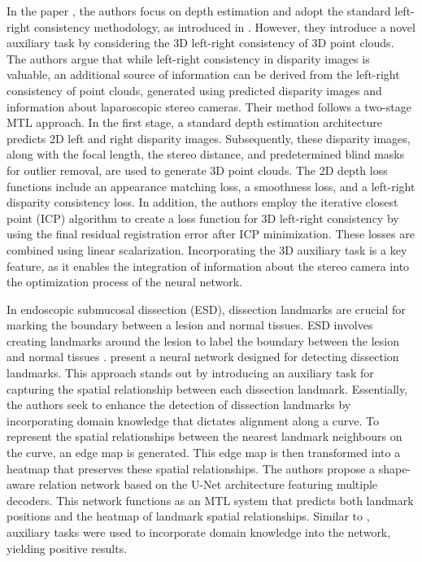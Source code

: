 In the paper \citet{ss_depth_estimation_laparo}, the authors focus on depth estimation and adopt the standard left-right consistency methodology, as introduced in \citet{monodepth17}. However, they introduce a novel auxiliary task by considering the 3D left-right consistency of 3D point clouds. The authors argue that while left-right consistency in disparity images is valuable, an additional source of information can be derived from the left-right consistency of point clouds, generated using predicted disparity images and information about laparoscopic stereo cameras.
Their method follows a two-stage MTL approach. In the first stage, a standard depth estimation architecture predicts 2D left and right disparity images. Subsequently, these disparity images, along with the focal length, the stereo distance, and predetermined blind masks for outlier removal, are used to generate 3D point clouds. The 2D depth loss functions include an appearance matching loss, a smoothness loss, and a left-right disparity consistency loss. In addition, the authors employ the iterative closest point (ICP) algorithm \citep{besl1992method} to create a loss function for 3D left-right consistency by using the final residual registration error after ICP minimization. These losses are combined using linear scalarization.
Incorporating the 3D auxiliary task is a key feature, as it enables the integration of information about the stereo camera into the optimization process of the neural network.

In endoscopic submucosal dissection (ESD), dissection landmarks are crucial for marking the boundary between a lesion and normal tissues. ESD involves creating landmarks around the lesion to label the boundary between the lesion and normal tissues \citep{ono2021guidelines}. \citet{landmark_detection_submucosal} present a neural network designed for detecting dissection landmarks.
This approach stands out by introducing an auxiliary task for capturing the spatial relationship between each dissection landmark. Essentially, the authors seek to enhance the detection of dissection landmarks by incorporating domain knowledge that dictates alignment along a curve. To represent the spatial relationships between the nearest landmark neighbours on the curve, an edge map is generated. This edge map is then transformed into a heatmap that preserves these spatial relationships.
The authors propose a shape-aware relation network based on the U-Net architecture featuring multiple decoders. This network functions as an MTL system that predicts both landmark positions and the heatmap of landmark spatial relationships. Similar to \citet{ss_depth_estimation_laparo}, auxiliary tasks were used to incorporate domain knowledge into the network, yielding positive results.


